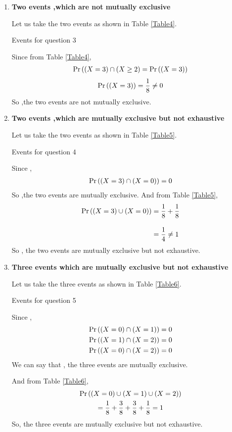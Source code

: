 \documentclass[journal,12pt,twocolumn]{IEEEtran}
\begin{document}
\begin{enumerate}[label=(\roman*)]
    \item \textbf{Two events ,which are not mutually exclusive}
    
    Let us take the two events as shown in Table \ref{Table4}.
    \begin{table}[ht!]
    \def\arraystretch{1.75}
        
        \caption{Events for question 3}
        \label{Table4}
    \end{table}

    Since from Table \ref{Table4},
    \begin{align}
        \Pr\left((X=3) \cap (X \ge 2\right) = \Pr\left((X=3)\right) 
    \end{align}
    \begin{align}
        \Pr\left((X=3)\right) = \dfrac{1}{8} \neq 0
    \end{align}
    So ,the two events are not mutually exclusive.
  
    \item \textbf{Two events ,which are mutually exclusive but not exhaustive}
    
    Let us take the two events as shown in Table \ref{Table5}.
    \begin{table}[ht!]
    \def\arraystretch{1.75}
        
        \caption{Events for question 4}
        \label{Table5}
    \end{table}
    Since ,
    \begin{align}
        \Pr\left((X=3) \cap (X=0)\right) = 0
    \end{align}
    So ,the two events are mutually exclusive. And from Table \ref{Table5},
    \begin{align}
        \Pr\left((X=3) \cup (X=0)\right) &= \dfrac{1}{8} + \dfrac{1}{8}\\[10pt]
                      &= \dfrac{1}{4} \neq 1
    \end{align}
    So , the two events are mutually exclusive but not exhaustive.
    
    \item \textbf{Three events which are mutually exclusive but not exhaustive}
    
    Let us take the three events as shown in Table \ref{Table6}.
    \begin{table}[ht!]
    \def\arraystretch{1.75}
        
        \caption{Events for question 5}
        \label{Table6}
    \end{table}
    Since , 
    \begin{align}
        \Pr\left((X=0) \cap (X=1)\right) &= 0 \\
        \Pr\left((X=1) \cap (X=2)\right) &= 0 \\
        \Pr\left((X=0) \cap (X=2)\right) &= 0
    \end{align}
    We can say that , the three events are mutually exclusive.
    
    And from Table \ref{Table6},
    \begin{multline}
        \Pr\left((X=0) \cup (X=1) \cup (X=2)\right)  \\ =
        \dfrac{1}{8}+\dfrac{3}{8}+\dfrac{3}{8}+\dfrac{1}{8} = 1 
    \end{multline}
    So, the three events are mutually exclusive but not exhaustive.
    
\end{enumerate}
\end{document}
